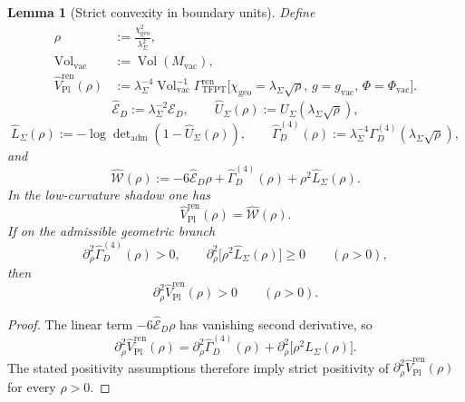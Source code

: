 \documentclass[11pt,a4paper]{article}
\newtheorem{lemma}[theorem]{Lemma}
\theoremstyle{definition}
\theoremstyle{remark}
\newcommand{\chigeo}{\chi_{\mathrm{geo}}}
\begin{document}
\begin{lemma}[Strict convexity in boundary units]
\label{lem:strict-convexity-rho-planck}
Define
\[
\begin{aligned}
\rho&:=\frac{\chigeo^2}{\lambda_\Sigma^2},
\\
\operatorname{Vol}_{\mathrm{vac}}&:=\operatorname{Vol}(M_{\mathrm{vac}}),
\\
\widehat V_{\mathrm{Pl}}^{\mathrm{ren}}(\rho)
&:=
\lambda_\Sigma^{-4}\operatorname{Vol}_{\mathrm{vac}}^{-1}
\Gamma_{\mathrm{TFPT}}^{\mathrm{ren}}
\bigl[\chigeo=\lambda_\Sigma\sqrt{\rho},\,g=g_{\mathrm{vac}},\,\Phi=\Phi_{\mathrm{vac}}\bigr].
\end{aligned}
\]
\[
\widehat{\mathcal E}_D:=\lambda_\Sigma^{-2}\mathcal E_D,
\qquad
\widehat U_\Sigma(\rho):=U_\Sigma(\lambda_\Sigma\sqrt{\rho}),
\]
\[
\widehat L_\Sigma(\rho):=-\log\det\nolimits_{\mathrm{adm}}(1-\widehat U_\Sigma(\rho)),
\qquad
\widehat\Gamma_D^{(4)}(\rho):=\lambda_\Sigma^{-4}\Gamma_D^{(4)}(\lambda_\Sigma\sqrt{\rho}),
\]
and
\[
\widehat{\mathcal W}(\rho):=
-6\widehat{\mathcal E}_D\rho
+\widehat\Gamma_D^{(4)}(\rho)
+\rho^2\widehat L_\Sigma(\rho).
\]
In the low-curvature shadow one has
\[
\widehat V_{\mathrm{Pl}}^{\mathrm{ren}}(\rho)=\widehat{\mathcal W}(\rho).
\]
If on the admissible geometric branch
\[
\partial_\rho^2\widehat\Gamma_D^{(4)}(\rho)>0,
\qquad
\partial_\rho^2\!\bigl[\rho^2\widehat L_\Sigma(\rho)\bigr]\ge 0
\qquad
(\rho>0),
\]
then
\[
\partial_\rho^2\widehat V_{\mathrm{Pl}}^{\mathrm{ren}}(\rho)>0
\qquad
(\rho>0).
\]
\end{lemma}

\begin{proof}
The linear term $-6\widehat{\mathcal E}_D\rho$ has vanishing second derivative, so
\[
\partial_\rho^2\widehat V_{\mathrm{Pl}}^{\mathrm{ren}}(\rho)
=
\partial_\rho^2\widehat\Gamma_D^{(4)}(\rho)
+
\partial_\rho^2\!\bigl[\rho^2\widehat L_\Sigma(\rho)\bigr].
\]
The stated positivity assumptions therefore imply strict positivity of
$\partial_\rho^2\widehat V_{\mathrm{Pl}}^{\mathrm{ren}}(\rho)$ for every $\rho>0$.
\end{proof}
\end{document}
